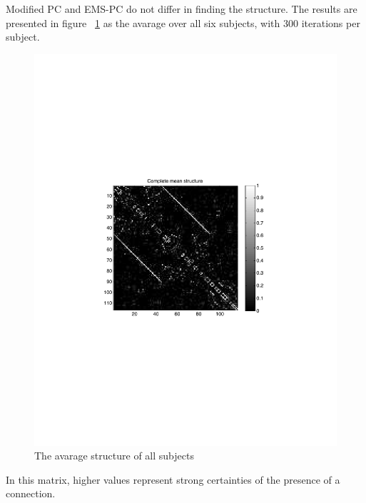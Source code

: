 \documentclass[a4paper, 10pt, english, onecolumn]{article}
\begin{document}
Modified PC and EMS-PC do not differ in finding the structure.
The results are presented in figure ~\ref{fig:struct_full_mean} as the avarage over all six subjects, with 300 iterations per subject.
\begin{figure}[h!]
  \centering
  \includegraphics{images/struct_full_mean_gray}
  \caption{The avarage structure of all subjects}
  \label{fig:struct_full_mean}
\end{figure}
In this matrix, higher values represent strong certainties of the presence of a connection.
\end{document}

